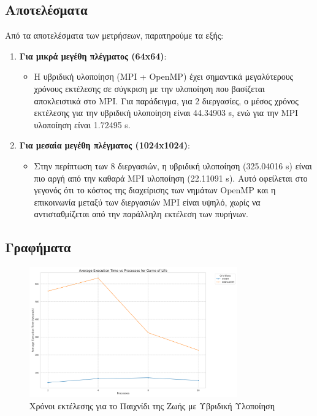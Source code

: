 \documentclass{article}
\begin{document}
\subsection*{Αποτελέσματα}
Από τα αποτελέσματα των μετρήσεων, παρατηρούμε τα εξής:
\begin{enumerate}
    \item \textbf{Για μικρά μεγέθη πλέγματος (64x64)}:
    \begin{itemize}
        \item Η υβριδική υλοποίηση (MPI + OpenMP) έχει σημαντικά μεγαλύτερους χρόνους εκτέλεσης σε σύγκριση με την υλοποίηση που βασίζεται αποκλειστικά στο MPI. Για παράδειγμα, για 2 διεργασίες, ο μέσος χρόνος εκτέλεσης για την υβριδική υλοποίηση είναι 44.34903 s, ενώ για την MPI υλοποίηση είναι 1.72495 s.
    \end{itemize}
    \item \textbf{Για μεσαία μεγέθη πλέγματος (1024x1024)}:
    \begin{itemize}
        \item Στην περίπτωση των 8 διεργασιών, η υβριδική υλοποίηση (325.04016 s) είναι πιο αργή από την καθαρά MPI υλοποίηση (22.11091 s). Αυτό οφείλεται στο γεγονός ότι το κόστος της διαχείρισης των νημάτων OpenMP και η επικοινωνία μεταξύ των διεργασιών MPI είναι υψηλό, χωρίς να αντισταθμίζεται από την παράλληλη εκτέλεση των πυρήνων.
    \end{itemize}
\end{enumerate}
\subsection*{Γραφήματα}
\newpage
\begin{figure}[h]
    \centering
    \includegraphics[width=0.8\textwidth]{game_of_life_hybrid_results.png}
    \caption{Χρόνοι εκτέλεσης για το Παιχνίδι της Ζωής με Υβριδική Υλοποίηση}
\end{figure}
\end{document}
